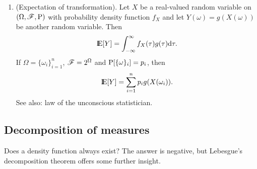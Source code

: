 \documentclass[a4paper,10pt]{scrbook}
\begin{document}
\begin{enumerate}
  \item (Expectation of transformation). Let $X$ be a real-valued random variable on \((\Omega,\mathscr{F},\mathrm{P})\) with 
  probability density function \(f_X\) and let $Y(\omega) = g(X(\omega))$  
  be another random variable. Then
  \[
   \E[Y] = \int_{-\infty}^{\infty} f_X(\tau) g(\tau) \d \tau.
  \]
  If $\Omega=\{\omega_i\}_{i=1}^{n}$, $\mathscr{F}=2^\Omega$ and $\mathrm{P}[\{\omega\}_i] = p_i$, then
  \[
   \E[Y] = \sum_{i=1}^{n}p_i g(X(\omega_i)).
  \]
  See also: law of the unconscious statistician.


\end{enumerate}

\subsection{Decomposition of measures}
Does a density function always exist? The answer is negative, but Lebesgue's decomposition 
theorem offers some further insight. 
\end{document}
